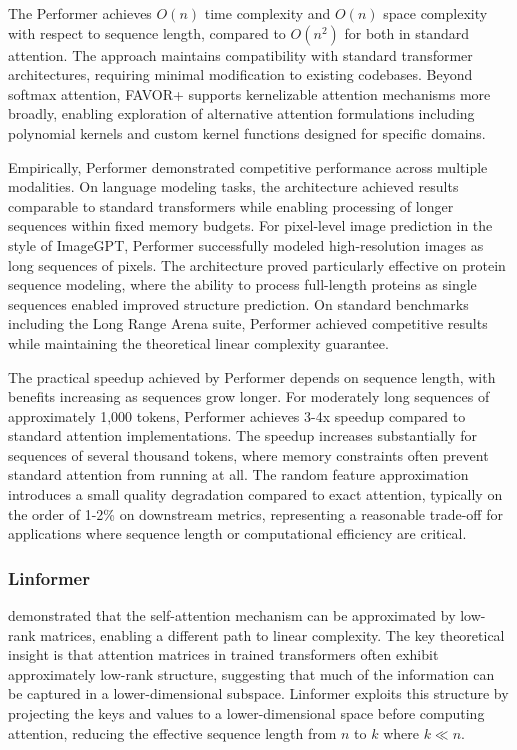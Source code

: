 The Performer achieves $O(n)$ time complexity and $O(n)$ space complexity with respect to sequence length, compared to $O(n^2)$ for both in standard attention. The approach maintains compatibility with standard transformer architectures, requiring minimal modification to existing codebases. Beyond softmax attention, FAVOR+ supports kernelizable attention mechanisms more broadly, enabling exploration of alternative attention formulations including polynomial kernels and custom kernel functions designed for specific domains.

Empirically, Performer demonstrated competitive performance across multiple modalities. On language modeling tasks, the architecture achieved results comparable to standard transformers while enabling processing of longer sequences within fixed memory budgets. For pixel-level image prediction in the style of ImageGPT, Performer successfully modeled high-resolution images as long sequences of pixels. The architecture proved particularly effective on protein sequence modeling, where the ability to process full-length proteins as single sequences enabled improved structure prediction. On standard benchmarks including the Long Range Arena suite, Performer achieved competitive results while maintaining the theoretical linear complexity guarantee.

The practical speedup achieved by Performer depends on sequence length, with benefits increasing as sequences grow longer. For moderately long sequences of approximately 1,000 tokens, Performer achieves 3-4x speedup compared to standard attention implementations. The speedup increases substantially for sequences of several thousand tokens, where memory constraints often prevent standard attention from running at all. The random feature approximation introduces a small quality degradation compared to exact attention, typically on the order of 1-2\% on downstream metrics, representing a reasonable trade-off for applications where sequence length or computational efficiency are critical.

\subsubsection{Linformer}

\citet{wang2020linformer} demonstrated that the self-attention mechanism can be approximated by low-rank matrices, enabling a different path to linear complexity. The key theoretical insight is that attention matrices in trained transformers often exhibit approximately low-rank structure, suggesting that much of the information can be captured in a lower-dimensional subspace. Linformer exploits this structure by projecting the keys and values to a lower-dimensional space before computing attention, reducing the effective sequence length from $n$ to $k$ where $k \ll n$.

